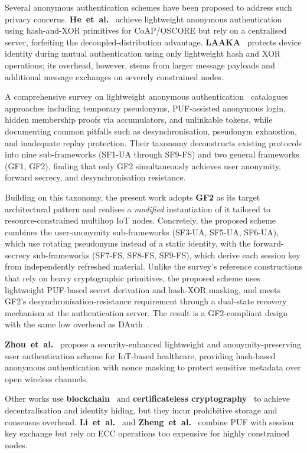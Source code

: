 Several anonymous authentication schemes have been proposed to address such privacy
concerns.
\textbf{He~et~al.}~\cite{he2023lightweight} achieve lightweight anonymous
authentication using hash-and-XOR primitives for CoAP/OSCORE but rely on a
centralised server, forfeiting the decoupled-distribution advantage.
\textbf{LAAKA}~\cite{ali2024laaka} protects device identity during mutual
authentication using only lightweight hash and XOR operations; its overhead,
however, stems from larger message payloads and additional message exchanges
on severely constrained nodes.

A comprehensive survey on lightweight anonymous
authentication~\cite{zhong2025survey} catalogues approaches including temporary
pseudonyms, PUF-assisted anonymous login, hidden membership proofs via accumulators,
and unlinkable tokens, while documenting common pitfalls such as desynchronisation,
pseudonym exhaustion, and inadequate replay protection.
Their taxonomy deconstructs existing protocols into nine sub-frameworks (SF1-UA
through SF9-FS) and two general frameworks (GF1, GF2), finding that only GF2
simultaneously achieves user anonymity, forward secrecy, and desynchronisation
resistance.

Building on this taxonomy, the present work adopts \textbf{GF2} as its target
architectural pattern and realises a \emph{modified} instantiation of it tailored to
resource-constrained multihop IoT nodes.
Concretely, the proposed scheme combines the user-anonymity sub-frameworks
(SF3-UA, SF5-UA, SF6-UA), which use rotating pseudonyms instead of a static
identity, with the forward-secrecy sub-frameworks (SF7-FS, SF8-FS, SF9-FS), which
derive each session key from independently refreshed material.
Unlike the survey's reference constructions that rely on heavy cryptographic
primitives, the proposed scheme uses lightweight PUF-based secret derivation and
hash-XOR masking, and meets GF2's desynchronisation-resistance requirement through
a dual-state recovery mechanism at the authentication server.
The result is a GF2-compliant design with the same low overhead as
DAuth~\cite{das2026comsnets}.

\textbf{Zhou~et~al.}~\cite{zhou2024auth} propose a security-enhanced lightweight
and anonymity-preserving user authentication scheme for IoT-based healthcare,
providing hash-based anonymous authentication with nonce masking to protect sensitive
metadata over open wireless channels.

Other works use \textbf{blockchain}~\cite{ahmed2023chains} and
\textbf{certificateless cryptography}~\cite{alriyami2003cert} to achieve
decentralisation and identity hiding, but they incur prohibitive storage and consensus
overhead.
\textbf{Li~et~al.}~\cite{li2020puf} and \textbf{Zheng~et~al.}~\cite{zheng2022puf}
combine PUF with session key exchange but rely on ECC operations too expensive for
highly constrained nodes.

